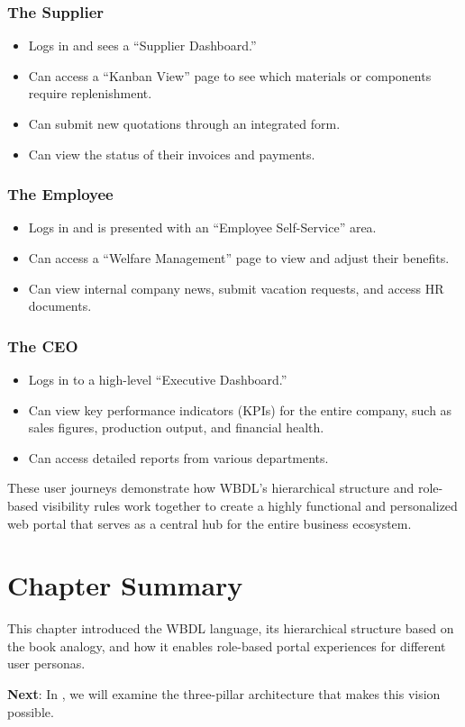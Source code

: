 \subsubsection{The Supplier}
\begin{itemize}
\item Logs in and sees a ``Supplier Dashboard.''
\item Can access a ``Kanban View'' page to see which materials or components require replenishment.
\item Can submit new quotations through an integrated form.
\item Can view the status of their invoices and payments.
\end{itemize}

\subsubsection{The Employee}
\begin{itemize}
\item Logs in and is presented with an ``Employee Self-Service'' area.
\item Can access a ``Welfare Management'' page to view and adjust their benefits.
\item Can view internal company news, submit vacation requests, and access HR documents.
\end{itemize}

\subsubsection{The CEO}
\begin{itemize}
\item Logs in to a high-level ``Executive Dashboard.''
\item Can view key performance indicators (KPIs) for the entire company, such as sales figures, production output, and financial health.
\item Can access detailed reports from various departments.
\end{itemize}

These user journeys demonstrate how WBDL's hierarchical structure and role-based visibility rules work together to create a highly functional and personalized web portal that serves as a central hub for the entire business ecosystem.

\section{Chapter Summary}

This chapter introduced the WBDL language, its hierarchical structure based on the book analogy, and how it enables role-based portal experiences for different user personas.

\textbf{Next}: In , we will examine the three-pillar architecture that makes this vision possible.
